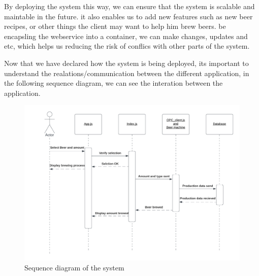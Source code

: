 By deploying the system this way, we can ensure that the system is scalable and maintable in the future. it also enables us to add new features such as new beer recipes, or other things the client may want to help him brew beers. be encapsling the webservice into a container, we can make changes, updates and etc, which helps us reducing the risk of conflics with other parts of the system. \newline


Now that we have declared how the system is being deployed, its important to understand the realations/communication between the different application, in the following sequence diagram, we can see the interation between the application.

\begin{center}
    \centering
    \begin{figure}[H]
        \includegraphics[width=1\textwidth]{img/SQdiagram_implementation.png}
        \caption{Sequence diagram of the system}
        \label{fig:SQdiagram_implementation}
    \end{figure}
\end{center}

